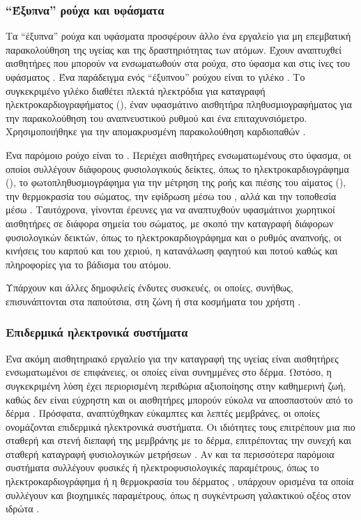 \subsubsection{``Έξυπνα'' ρούχα και υφάσματα}
Τα ``έξυπνα'' ρούχα και υφάσματα προσφέρουν άλλο ένα εργαλείο για μη επεμβατική παρακολούθηση της υγείας και της δραστηριότητας των ατόμων.
Έχουν αναπτυχθεί αισθητήρες που μπορούν να ενσωματωθούν στα ρούχα, στο ύφασμα και στις ίνες του υφάσματος \cite{rashidi2012survey}.
Ένα παράδειγμα ενός ``έξυπνου'' ρούχου είναι το γιλέκο .
Το συγκεκριμένο γιλέκο διαθέτει πλεκτά ηλεκτρόδια για καταγραφή ηλεκτροκαρδιογραφήματος (), έναν υφασμάτινο αισθητήρα πληθυσμιογραφήματος για την παρακολούθηση του αναπνευστικού ρυθμού και ένα επιταχυνσιόμετρο.
Χρησιμοποιήθηκε για την απομακρυσμένη παρακολούθηση καρδιοπαθών \cite{Rienzo2010}.
\par
Ένα παρόμοιο ρούχο είναι το  .\cite{Pandian2008}
Περιέχει αισθητήρες ενσωματωμένους στο ύφασμα, οι οποίοι συλλέγουν διάφορους φυσιολογικούς δείκτες, όπως το ηλεκτροκαρδιογράφημα (), το φωτοπληθυσμιογράφημα για την μέτρηση της ροής και πιέσης του αίματος (), την θερμοκρασία του σώματος, την εφίδρωση μέσω του , αλλά και την τοποθεσία μέσω .
Ταυτόχρονα, γίνονται έρευνες \cite{Chang2013} για να αναπτυχθούν υφασμάτινοι χωρητικοί αισθητήρες σε διάφορα σημεία του σώματος, με σκοπό την καταγραφή διάφορων φυσιολογικών δεικτών, όπως το ηλεκτροκαρδιογράφημα και ο ρυθμός αναπνοής, οι κινήσεις του καρπού και του χεριού, η κατανάλωση φαγητού και ποτού καθώς και πληροφορίες για το βάδισμα του ατόμου.
\par
Υπάρχουν και άλλες δημοφιλείς ένδυτες συσκευές, οι οποίες, συνήθως, επισυνάπτονται στα παπούτσια, στη ζώνη ή στα κοσμήματα του χρήστη \cite{Brodie2016}\cite{Achkar2016}\cite{Sardini2010}\cite{Sim2011}.
\subsubsection{Επιδερμικά ηλεκτρονικά συστήματα}
Ένα ακόμη αισθητηριακό εργαλείο για την καταγραφή της υγείας είναι αισθητήρες ενσωματωμένοι σε επιφάνειες, οι οποίες είναι συνημμένες στο δέρμα. 
Ωστόσο, η συγκεκριμένη λύση έχει περιορισμένη περιθώρια αξιοποίησης στην καθημερινή ζωή, καθώς δεν είναι εύχρηστη και οι αισθητήρες μπορούν εύκολα να αποσπαστούν από το δέρμα \cite{Yeo2013}.
Πρόσφατα, αναπτύχθηκαν εύκαμπτες και λεπτές μεμβράνες, οι οποίες ονομάζονται επιδερμικά ηλεκτρονικά συστήματα.
Οι ιδιότητες τους επιτρέπουν μια πιο σταθερή και στενή διεπαφή της μεμβράνης με το δέρμα, επιτρέποντας την συνεχή και σταθερή καταγραφή φυσιολογικών μετρήσεων \cite{Imani2016}.
Αν και τα περισσότερα παρόμοια συστήματα συλλέγουν φυσικές ή ηλεκτροφυσιολογικές παραμέτρους, όπως το ηλεκτροκαρδιογράφημα ή η θερμοκρασία του δέρματος \cite{Bian2014}\cite{Webb2013}\cite{Yeo2013}, υπάρχουν ορισμένα τα οποία συλλέγουν και βιοχημικές παραμέτρους, όπως η συγκέντρωση γαλακτικού οξέος στον ιδρώτα \cite{Imani2016}.
